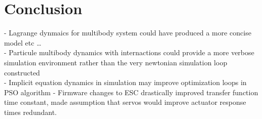 \chapter{Conclusion}
\label{ch:conclusion}
- Lagrange dynmaics for multibody system could have produced a more concise model etc \ldots\\
- Particule multibody dynamics with internactions could provide a more verbose simulation environment rather than the very newtonian simulation loop constructed\\
- Implicit equation dynamics in simulation may improve optimization loops in PSO algorithm
- Firmware changes to ESC drastically improved transfer function time constant, made assumption that servos would improve actuator response times redundant.
